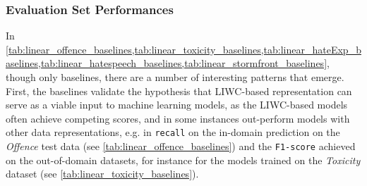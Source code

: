 \subsubsection{Evaluation Set Performances}
In \cref{tab:linear_offence_baselines,tab:linear_toxicity_baselines,tab:linear_hateExp_baselines,tab:linear_hatespeech_baselines,tab:linear_stormfront_baselines}, though only baselines, there are a number of interesting patterns that emerge.
First, the baselines validate the hypothesis that LIWC-based representation can serve as a viable input to machine learning models, as the LIWC-based models often achieve competing scores, and in some instances out-perform models with other data representations, e.g. in \texttt{recall} on the in-domain prediction on the \textit{Offence} test data (see \cref{tab:linear_offence_baselines}) and the \texttt{F1-score} achieved on the out-of-domain datasets, for instance for the models trained on the \textit{Toxicity} dataset (see \cref{tab:linear_toxicity_baselines}).
